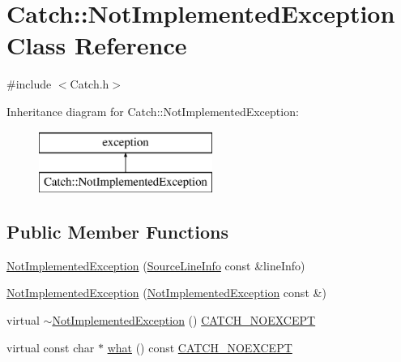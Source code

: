 \hypertarget{class_catch_1_1_not_implemented_exception}{}\section{Catch\+:\+:Not\+Implemented\+Exception Class Reference}
\label{class_catch_1_1_not_implemented_exception}


{\ttfamily \#include $<$Catch.\+h$>$}

Inheritance diagram for Catch\+:\+:Not\+Implemented\+Exception\+:\begin{figure}[H]
\begin{center}
\leavevmode
\includegraphics[height=2.000000cm]{class_catch_1_1_not_implemented_exception}
\end{center}
\end{figure}
\subsection*{Public Member Functions}
\begin{DoxyCompactItemize}
\item 
\hyperlink{class_catch_1_1_not_implemented_exception_ab4f0a5c39d8ffb72c664e2c07e180634}{Not\+Implemented\+Exception} (\hyperlink{struct_catch_1_1_source_line_info}{Source\+Line\+Info} const \&line\+Info)
\item 
\hyperlink{class_catch_1_1_not_implemented_exception_a508a7a833455da2d3c10ea1a9d45e982}{Not\+Implemented\+Exception} (\hyperlink{class_catch_1_1_not_implemented_exception}{Not\+Implemented\+Exception} const \&)
\item 
virtual \hyperlink{class_catch_1_1_not_implemented_exception_a557e7312aaa32c37bded019f2b059bcb}{$\sim$\+Not\+Implemented\+Exception} () \hyperlink{_catch_8h_a0408e94ca73880d41f38852b68eadb3c}{C\+A\+T\+C\+H\+\_\+\+N\+O\+E\+X\+C\+E\+PT}
\item 
virtual const char $\ast$ \hyperlink{class_catch_1_1_not_implemented_exception_ad4c13963f1a8feacda0cd331adda89e3}{what} () const \hyperlink{_catch_8h_a0408e94ca73880d41f38852b68eadb3c}{C\+A\+T\+C\+H\+\_\+\+N\+O\+E\+X\+C\+E\+PT}
\end{DoxyCompactItemize}


